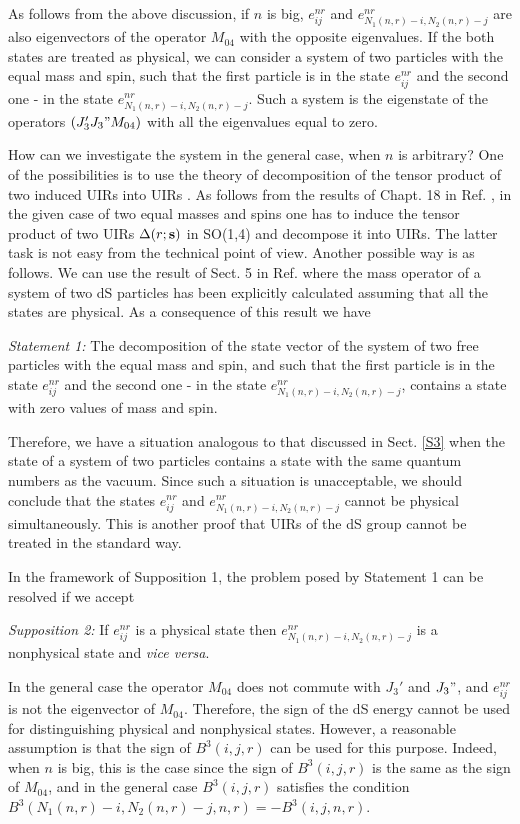 \documentclass[a4paper,12pt]{article}%
\begin{document}
As follows from the above discussion, if $n$ is big,
$e^{nr}_{ij}$ and $e^{nr}_{N_1(n,r)-i,N_2(n,r)-j}$
are also eigenvectors of the operator $M_{04}$ with
the opposite eigenvalues. If the both states are
treated as physical, we can consider a system of two
particles with the equal mass and spin, such that the
first particle is in the state $e^{nr}_{ij}$ and the
second one - in the state 
$e^{nr}_{N_1(n,r)-i,N_2(n,r)-j}$. Such a system is
the eigenstate of the operators $(J_3'J_3"M_{04})$
with all the eigenvalues equal to zero. 

How can we investigate the system in the general
case, when $n$ is arbitrary? One of the possibilities
is to use the theory of decomposition of the tensor
product of two induced UIRs into UIRs 
\cite{Naimark,Klimyk2,Barut}. As follows from the
results of Chapt. 18 in Ref. \cite{Barut}, in the 
given case of two equal masses and spins one has
to induce the tensor product of two UIRs 
$\Delta(r;{\bf s})$ in SO(1,4) and decompose it
into UIRs. The latter task is not easy from the
technical point of view. Another possible way is
as follows. We can use the result of Sect. 5 in 
Ref. \cite{lev1} where the mass operator of a system
of two dS particles has been explicitly calculated
assuming that all the states are physical.
As a consequence of this result we have 

{\it Statement 1:} The decomposition of the state 
vector of the system of two free particles with the 
equal mass and spin, and 
such that the first particle is in the state 
$e^{nr}_{ij}$ and the second one - in the state 
$e^{nr}_{N_1(n,r)-i,N_2(n,r)-j}$, contains a state
with zero values of mass and spin.    

Therefore, we have a 
situation analogous to that discussed in Sect.
\ref{S3} when the state of a system of two 
particles contains a state with the 
same quantum numbers as the vacuum. Since such a
situation is unacceptable, we should conclude that
the states $e^{nr}_{ij}$ and 
$e^{nr}_{N_1(n,r)-i,N_2(n,r)-j}$ cannot be
physical simultaneously. This is another proof
that UIRs of the dS group cannot be treated in the
standard way.

In the framework of Supposition 1, the problem
posed by Statement 1 can be resolved if we accept

{\it Supposition 2:} If $e^{nr}_{ij}$ is 
a physical state then $e^{nr}_{N_1(n,r)-i,N_2(n,r)-j}$
is a nonphysical state and {\it vice versa}. 

In the general case the operator $M_{04}$ does not
commute with $J_3'$ and $J_3"$, and $e^{nr}_{ij}$ 
is not the eigenvector of $M_{04}$.  
Therefore, the sign of the dS energy cannot be used 
for distinguishing physical 
and nonphysical states. However, a reasonable 
assumption is that the sign of $B^3(i,j,r)$ can be
used for this purpose. Indeed, when $n$ is big,
this is the case since the sign of $B^3(i,j,r)$ is
the same as the sign of $M_{04}$, and in the general
case $B^3(i,j,r)$ satisfies the condition
$B^3(N_1(n,r)-i,N_2(n,r)-j,n,r)=-B^3(i,j,n,r)$. 
\end{document}
